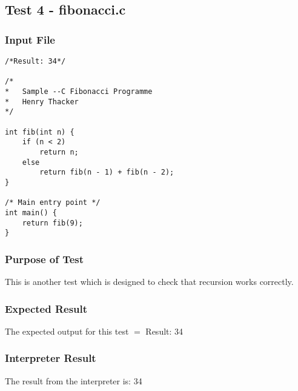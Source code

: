 \subsection{Test 4 - fibonacci.c}
\subsubsection{Input File}
\begin{lstlisting}[showstringspaces=false,breaklines=true,backgroundcolor=\color{light-gray}, captionpos=b]
/*Result: 34*/

/*
*	Sample --C Fibonacci Programme
*	Henry Thacker
*/

int fib(int n) {
	if (n < 2) 
		return n;
	else
		return fib(n - 1) + fib(n - 2);
}

/* Main entry point */
int main() {
	return fib(9);
}
\end{lstlisting}\subsubsection{Purpose of Test}
This is another test which is designed to check that recursion works correctly.

\subsubsection{Expected Result}
The expected output for this test $=$ Result: 34
\subsubsection{Interpreter Result}
The result from the interpreter is: 34
